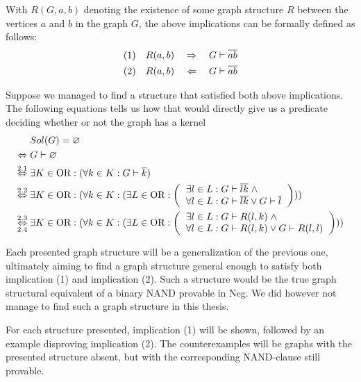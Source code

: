 With $R(G,a,b)$ denoting the existence of some graph structure $R$ between the vertices $a$ and $b$ in the graph $G$, the above implications can be formally defined as follows:
\begin{align}
  (1) \quad R(a,b) \quad \Rightarrow \quad G \vdash \ol{ab}\\
  (2) \quad R(a,b) \quad \Leftarrow \quad G \vdash \ol{ab}
\end{align}

Suppose we managed to find a structure that satisfied both above implications.
The following equations tells us how that would directly give us a predicate deciding whether or not the graph has a kernel
\begin{align}
  &Sol(G) = \varnothing\\
  \Leftrightarrow\; &G \vdash \varnothing\\
  \overset{2.1}{\Leftrightarrow}\;&\exists K \in \text{OR}: (\forall  k \in K: G \vdash \ol{k})\\
  \overset{2.2}{\Leftrightarrow}\;&\exists K \in \text{OR}: (\forall  k \in K: ( \exists L \in \text{OR}:
  \left ( \begin{tabular}{l}
  $\exists l \in L: G \vdash \ol{lk} \; \wedge$\\
  $\forall l \in L: G \vdash \ol{lk} \vee G \vdash \ol{l}$
  \end{tabular} \right ) ) )\\
  \overset{2.3}{\underset{2.4}{\Leftrightarrow}}\;&\exists K \in \text{OR}: (\forall  k \in K: ( \exists L \in \text{OR}:
  \left ( \begin{tabular}{l}
  $\exists l \in L: G \vdash R(l,k) \; \wedge$\\
  $\forall l \in L: G \vdash R(l,k) \vee G \vdash R(l,l)$
  \end{tabular} \right ) ) )
\end{align}

Each presented graph structure will be a generalization of the previous one, ultimately aiming to find a graph structure general enough to satisfy both implication (1) and implication (2).
Such a structure would be the true graph structural equivalent of a binary NAND provable in Neg.
We did however not manage to find such a graph structure in this thesis.

For each structure presented, implication (1) will be shown, followed by an example disproving implication (2).
The counterexamples will be graphs with the presented structure absent, but with the corresponding NAND-clause still provable.
